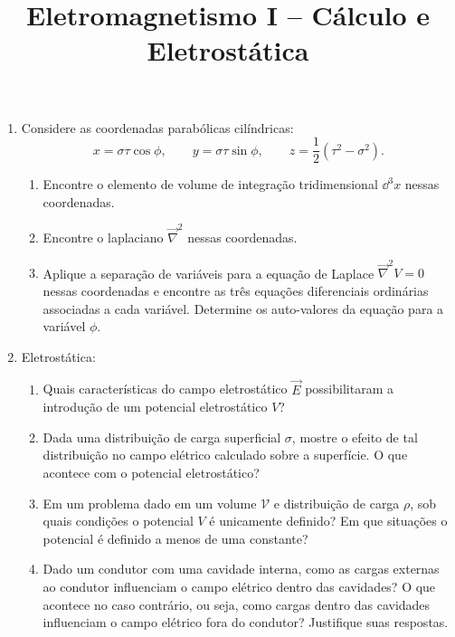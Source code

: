 \newif\ifuseseminar
\useseminartrue


\title{Eletromagnetismo I -- Cálculo e Eletrostática}	


\begin{enumerate}
	\item Considere as coordenadas parabólicas cilíndricas:
	      \begin{equation}
		      x = \sigma\tau\cos\phi, \qquad y = \sigma\tau\sin\phi,
		      \qquad z = \frac{1}{2}\left(\tau^2-\sigma^2\right).
	      \end{equation}
	      \begin{enumerate}
		      \item Encontre o elemento de volume de integração tridimensional $\dd^3x$
		            nessas coordenadas.
		      \item Encontre o laplaciano $\vec\nabla^2$ nessas coordenadas.
		      \item Aplique a separação de variáveis para a equação de Laplace
		            $\vec\nabla^2V=0$ nessas coordenadas e encontre as três equações
		            diferenciais ordinárias associadas a cada variável. Determine os
		            auto-valores da equação para a variável $\phi$.
	      \end{enumerate}
	\item Eletrostática:
	      \begin{enumerate}
		      \item Quais características do campo eletrostático $\vec E$ possibilitaram
		            a introdução de um potencial eletrostático $V$?
		      \item Dada uma distribuição de carga superficial $\sigma$, mostre o efeito
		            de tal distribuição no campo elétrico calculado sobre a superfície. O que
		            acontece com o potencial eletrostático?
		      \item Em um problema dado em um volume $\mathcal{V}$ e distribuição de
		            carga $\rho$, sob quais condições o potencial $V$ é unicamente definido?
		            Em que situações o potencial é definido a menos de uma constante?
		      \item Dado um condutor com uma cavidade interna, como as cargas externas
		            ao condutor influenciam o campo elétrico dentro das cavidades? O que
		            acontece no caso contrário, ou seja, como cargas dentro das cavidades
		            influenciam o campo elétrico fora do condutor? Justifique suas respostas.
	      \end{enumerate}
\end{enumerate}
